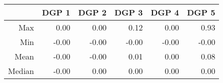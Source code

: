 \begin{table}[ht]
\centering
\begin{tabular}{rrrrrr}
  \hline
 & DGP 1 & DGP 2 & DGP 3 & DGP 4 & DGP 5 \\ 
  \hline
Max & 0.00 & 0.00 & 0.12 & 0.00 & 0.93 \\ 
  Min & -0.00 & -0.00 & -0.00 & -0.00 & -0.00 \\ 
  Mean & -0.00 & -0.00 & 0.01 & 0.00 & 0.08 \\ 
  Median & -0.00 & 0.00 & 0.00 & 0.00 & 0.00 \\ 
   \hline
\end{tabular}
\end{table}
